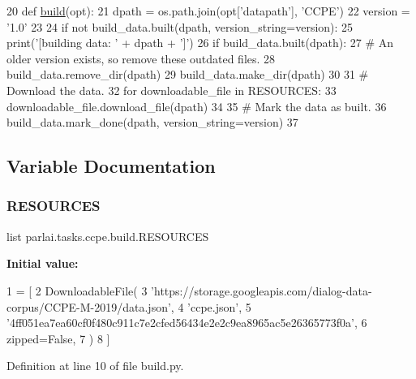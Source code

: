 \begin{DoxyCode}
20 \textcolor{keyword}{def }\hyperlink{namespacedialog__babi__feedback_1_1build_a7a9d289f7493a5ded13c4b7f071b6184}{build}(opt):
21     dpath = os.path.join(opt[\textcolor{stringliteral}{'datapath'}], \textcolor{stringliteral}{'CCPE'})
22     version = \textcolor{stringliteral}{'1.0'}
23 
24     \textcolor{keywordflow}{if} \textcolor{keywordflow}{not} build\_data.built(dpath, version\_string=version):
25         print(\textcolor{stringliteral}{'[building data: '} + dpath + \textcolor{stringliteral}{']'})
26         \textcolor{keywordflow}{if} build\_data.built(dpath):
27             \textcolor{comment}{# An older version exists, so remove these outdated files.}
28             build\_data.remove\_dir(dpath)
29         build\_data.make\_dir(dpath)
30 
31         \textcolor{comment}{# Download the data.}
32         \textcolor{keywordflow}{for} downloadable\_file \textcolor{keywordflow}{in} RESOURCES:
33             downloadable\_file.download\_file(dpath)
34 
35         \textcolor{comment}{# Mark the data as built.}
36         build\_data.mark\_done(dpath, version\_string=version)
37 \end{DoxyCode}


\subsection{Variable Documentation}
\mbox{\label{namespaceparlai_1_1tasks_1_1ccpe_1_1build_a5df2747fef648c490cbe2ac949f6648e}} 
\subsubsection{\texorpdfstring{R\+E\+S\+O\+U\+R\+C\+ES}{RESOURCES}}
{\footnotesize\ttfamily list parlai.\+tasks.\+ccpe.\+build.\+R\+E\+S\+O\+U\+R\+C\+ES}

{\bfseries Initial value\+:}
\begin{DoxyCode}
1 =  [
2     DownloadableFile(
3         \textcolor{stringliteral}{'https://storage.googleapis.com/dialog-data-corpus/CCPE-M-2019/data.json'},
4         \textcolor{stringliteral}{'ccpe.json'},
5         \textcolor{stringliteral}{'4ff051ea7ea60cf0f480c911c7e2cfed56434e2e2c9ea8965ac5e26365773f0a'},
6         zipped=\textcolor{keyword}{False},
7     )
8 ]
\end{DoxyCode}


Definition at line 10 of file build.\+py.

